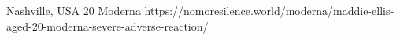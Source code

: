           {Nashville, USA}
          {20}
          {Moderna}
          {}
          {
          }
          {https://nomoresilence.world/moderna/maddie-ellis-aged-20-moderna-severe-adverse-reaction/}

